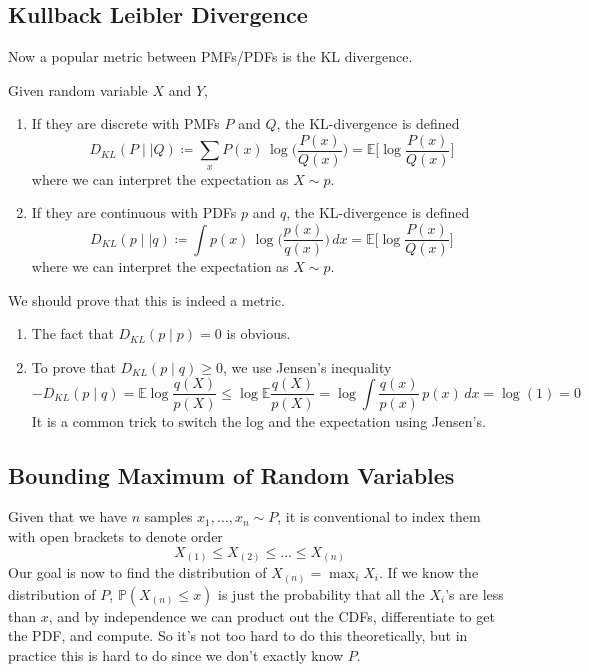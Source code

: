 \documentclass{article}
\begin{document}
    \subsection{Kullback Leibler Divergence}

    Now a popular metric between PMFs/PDFs is the KL divergence. 

    \begin{definition}
    Given random variable $X$ and $Y$, 
    \begin{enumerate}
        \item If they are discrete with PMFs $P$ and $Q$, the KL-divergence is defined 
        \[D_{KL} (P \mid\mid Q) \coloneqq \sum_{x} P(x) \, \log \bigg(\frac{P(x)}{Q(x)} \bigg) = \mathbb{E} \bigg[ \log \frac{P(x)}{Q(x)} \bigg] \]
        where we can interpret the expectation as $X \sim p$. 
        \item If they are continuous with PDFs $p$ and $q$, the KL-divergence is defined 
        \[D_{KL} (p \mid\mid q) \coloneqq \int p(x) \, \log \bigg( \frac{p(x)}{q(x)} \bigg)\,dx = \mathbb{E} \bigg[ \log \frac{P(x)}{Q(x)} \bigg] \]
        where we can interpret the expectation as $X \sim p$. 
    \end{enumerate}
    \end{definition}

    We should prove that this is indeed a metric. 
    \begin{enumerate}
        \item The fact that $D_{KL} (p \mid p) = 0$ is obvious. 
        \item To prove that $D_{KL} (p \mid q) \geq 0$, we use Jensen's inequality
        \[-D_{KL} (p \mid q) = \mathbb{E} \log \frac{q(X)}{p(X)} \leq \log \mathbb{E} \frac{q(X)}{p(X)} = \log \int \frac{q(x)}{p(x)} \, p(x) \, dx = \log(1) = 0\]
        It is a common trick to switch the log and the expectation using Jensen's. 
    \end{enumerate}

    \subsection{Bounding Maximum of Random Variables}

    Given that we have $n$ samples $x_1, \ldots, x_n \sim P$, it is conventional to index them with open brackets to denote order 
    \[X_{(1)} \leq X_{(2)} \leq \ldots \leq X_{(n)}\]
    Our goal is now to find the distribution of $X_{(n)} = \max_i X_i$. If we know the distribution of $P$, $\mathbb{P}(X_{(n)} \leq x)$ is just the probability that all the $X_i$'s are less than $x$, and by independence we can product out the CDFs, differentiate to get the PDF, and compute. So it's not too hard to do this theoretically, but in practice this is hard to do since we don't exactly know $P$. 
\end{document}
